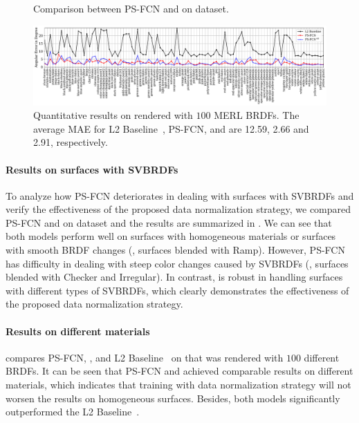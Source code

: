 \begin{figure}[htbp] \centering
    
    \caption[Comparison between PS-FCN and \PSFCNplusN on \dragonSVBRDF dataset]{Comparison between PS-FCN and \PSFCNplusN on \dragonSVBRDF dataset.} \label{fig:res_synth_SVBRDF} %
\end{figure}

\begin{figure}\centering
    \includegraphics[width=\textwidth]{ch-psfcn/images/Results/Synth_Test/L2_combine.pdf} 
    \caption[Quantitative results on  rendered with $100$ MERL BRDFs]{Quantitative results on  rendered with $100$ MERL BRDFs.  The average MAE for L2 Baseline~\cite{woodham1980ps}, PS-FCN, and \PSFCNplusN are 12.59, 2.66 and 2.91, respectively.} \label{fig:100brdfs}
\end{figure}

\paragraph{Results on surfaces with SVBRDFs} 
To analyze how PS-FCN deteriorates in dealing with surfaces with SVBRDFs and verify the effectiveness of the proposed data normalization strategy, we compared PS-FCN and \PSFCNplusN on \dragonSVBRDF dataset and the results are summarized in . We can see that both models perform well on surfaces with homogeneous materials or surfaces with smooth BRDF changes (\eg, surfaces blended with Ramp). However, PS-FCN has difficulty in dealing with steep color changes caused by SVBRDFs (\eg, surfaces blended with Checker and Irregular). In contrast, \PSFCNplusN is robust in handling surfaces with different types of SVBRDFs, which clearly demonstrates the effectiveness of the proposed data normalization strategy.

\paragraph{Results on different materials}
     compares PS-FCN, \PSFCNplusN, and L2 Baseline~\cite{woodham1980ps} on  that was rendered with $100$ different BRDFs.
It can be seen that PS-FCN and \PSFCNplusN achieved comparable results on different materials, which indicates that training with data normalization strategy will not worsen the results on homogeneous surfaces. 
Besides, both models significantly outperformed the L2 Baseline~\cite{woodham1980ps}. 

